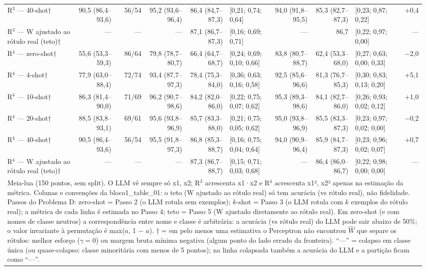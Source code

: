 \begin{table}[htbp]
\begin{tabular}{lrrrrlrrlr}
R$^3$ — 40-shot† & 90,5 (86,4–93,6) & 56/54 & 95,2 (93,6–96,4) & 86,4 (84,7–87,3) & [0,21; 0,74; 0,64] & 94,0 (91,8–95,5) & 85,3 (82,7–87,3) & [0,23; 0,87; 0,22] & +0,4 \\
R$^3$ — W ajustado ao rótulo real (teto)† & — & — & — & 87,1 (86,7–87,3) & [0,16; 0,69; 0,71] & — & 86,7 & [0,22; 0,97; 0,00] & — \\
\midrule
R$^4$ — zero-shot† & 55,6 (53,3–59,3) & 86/64 & 79,8 (78,7–80,7) & 66,4 (64,7–68,7) & [0,24; 0,69; 0,10; 0,66] & 83,8 (80,7–88,7) & 62,4 (53,3–68,0) & [0,27; 0,63; 0,00; 0,33] & $-$2,0 \\
R$^4$ — 4-shot† & 77,9 (63,0–88,4) & 72/74 & 93,4 (87,7–97,3) & 78,4 (75,3–84,0) & [0,36; 0,63; 0,16; 0,58] & 92,5 (85,6–96,6) & 81,3 (76,7–85,3) & [0,30; 0,83; 0,13; 0,20] & +5,1 \\
R$^4$ — 10-shot† & 86,3 (81,4–90,0) & 71/69 & 96,2 (90,7–98,6) & 84,2 (82,0–86,0) & [0,22; 0,75; 0,07; 0,62] & 95,3 (89,3–98,6) & 84,1 (82,7–86,0) & [0,26; 0,93; 0,02; 0,12] & +1,0 \\
R$^4$ — 20-shot† & 88,5 (83,8–93,1) & 69/61 & 95,6 (93,8–96,9) & 85,7 (83,3–88,0) & [0,21; 0,75; 0,05; 0,62] & 95,0 (93,8–96,9) & 85,5 (83,3–87,3) & [0,23; 0,97; 0,02; 0,00] & $-$0,2 \\
R$^4$ — 40-shot† & 90,5 (86,4–93,6) & 56/54 & 95,5 (91,8–97,3) & 86,8 (85,3–88,7) & [0,16; 0,75; 0,04; 0,64] & 94,0 (90,9–96,4) & 85,9 (84,7–87,3) & [0,23; 0,96; 0,02; 0,07] & +0,7 \\
R$^4$ — W ajustado ao rótulo real (teto)† & — & — & — & 87,3 (86,7–88,7) & [0,15; 0,71; 0,03; 0,68] & — & 86,4 (86,0–86,7) & [0,22; 0,98; 0,00; 0,00] & — \\
\bottomrule
\multicolumn{10}{p{0.95\linewidth}}{\footnotesize Meia-lua (150 pontos, sem split). O LLM vê sempre só x1, x2; R$^3$ acrescenta x1·x2 e R$^4$ acrescenta x1², x2² apenas na estimação da métrica. Colunas e convenções da bloco1\_table\_01: o teto (W ajustado ao rótulo real) só tem acurácia (vs rótulo real), não fidelidade. Passos do Problema D: zero-shot = Passo 2 (o LLM rotula sem exemplos); $k$-shot = Passo 3 (o LLM rotula com $k$ exemplos do rótulo real); a métrica de cada linha é estimada no Passo 4; teto = Passo 5 (W ajustado diretamente ao rótulo real). Em zero-shot (e com nomes de classe neutros) a correspondência entre nome e classe é arbitrária: a acurácia (vs rótulo real) do LLM pode sair abaixo de 50\%; o valor invariante à permutação é max($a$, 1 $-$ $a$). † = em pelo menos uma estimativa o Perceptron não encontrou $\hat{W}$ que separe os rótulos: melhor esforço ($\gamma = 0$) ou margem bruta mínima negativa (algum ponto do lado errado da fronteira). ``—'' = colapso em classe única (ou quase-colapso: classe minoritária com menos de 5 pontos); na linha colapsada também a acurácia do LLM e a partição ficam como ``—''.} \\
\end{tabular}
\end{table}
